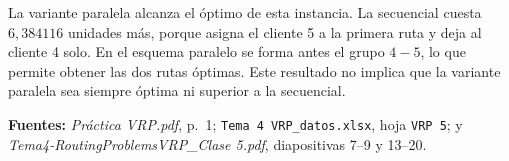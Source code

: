 \documentclass[10pt,a4paper]{article}
\begin{document}
La variante paralela alcanza el óptimo de esta instancia. La secuencial
cuesta $6{,}384116$ unidades más, porque asigna el cliente 5 a la primera ruta
y deja al cliente 4 solo. En el esquema paralelo se forma antes el grupo
$4-5$, lo que permite obtener las dos rutas óptimas. Este resultado no implica
que la variante paralela sea siempre óptima ni superior a la secuencial.

\smallskip
{\footnotesize\textbf{Fuentes:} \textit{Práctica VRP.pdf}, p.\ 1;
\texttt{Tema 4 VRP\_datos.xlsx}, hoja \texttt{VRP 5}; y
\textit{Tema4-RoutingProblemsVRP\_Clase 5.pdf}, diapositivas 7--9 y 13--20.}
\end{document}
